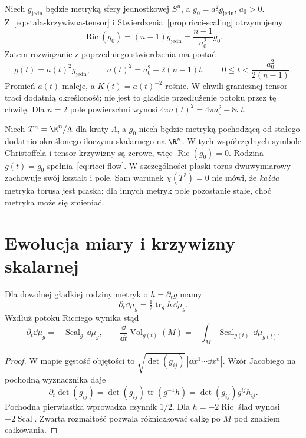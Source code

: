 \begin{przyklad}
\label{prz:ricci-sphere}
Niech $g_{\mathrm{jedn}}$ będzie metryką sfery jednostkowej
$S^n$, a $g_0=a_0^2g_{\mathrm{jedn}}$, $a_0>0$.
Z~\eqref{eq:stala-krzywizna-tensor} i
Stwierdzenia~\ref{prop:ricci-scaling} otrzymujemy
\[
 \operatorname{Ric}(g_0)
 =(n-1)g_{\mathrm{jedn}}
 =\frac{n-1}{a_0^2}g_0.
\]
Zatem rozwiązanie z poprzedniego stwierdzenia ma postać
\begin{equation}\label{eq:ricci-sphere}
 g(t)=a(t)^2g_{\mathrm{jedn}},\qquad
 a(t)^2=a_0^2-2(n-1)t,
 \qquad 0\leq t<\frac{a_0^2}{2(n-1)}.
\end{equation}
Promień $a(t)$ maleje, a $K(t)=a(t)^{-2}$ rośnie.
W chwili granicznej tensor traci dodatnią określoność;
nie jest to gładkie przedłużenie potoku przez tę chwilę.
Dla $n=2$ pole powierzchni wynosi
$4\pi a(t)^2=4\pi a_0^2-8\pi t$.
\end{przyklad}

\begin{przyklad}
\label{prz:ricci-torus}
Niech $T^n=\R^n/\Lambda$ dla kraty $\Lambda$,
a $g_0$ niech będzie metryką pochodzącą od stałego
dodatnio określonego iloczynu skalarnego na $\R^n$.
W tych współrzędnych symbole Christoffela i tensor
krzywizny są zerowe, więc $\operatorname{Ric}(g_0)=0$.
Rodzina $g(t)=g_0$ spełnia~\eqref{eq:ricci-flow}.
W szczególności płaski torus dwuwymiarowy zachowuje
swój kształt i pole. Sam warunek $\chi(T^2)=0$ nie mówi,
że \emph{każda} metryka torusa jest płaska; dla innych
metryk pole pozostanie stałe, choć metryka może się
zmieniać.
\end{przyklad}

\section{Ewolucja miary i krzywizny skalarnej}
\label{sec:ricci-evolution}

\begin{stwierdzenie}
\label{prop:ricci-volume}
Dla dowolnej gładkiej rodziny metryk o
$h=\partial_tg$ mamy
\[
 \partial_t\dd\mu_g
   =\tfrac12\operatorname{tr}_g h\,\dd\mu_g.
\]
Wzdłuż potoku Ricciego wynika stąd
\begin{equation}\label{eq:ricci-volume}
 \partial_t\dd\mu_g=-\operatorname{Scal}_g\,\dd\mu_g,
 \qquad
 \frac{\dd}{\dd t}\operatorname{Vol}_{g(t)}(M)
 =-\int_M\operatorname{Scal}_{g(t)}\,\dd\mu_{g(t)}.
\end{equation}
\end{stwierdzenie}
\begin{proof}
W mapie gęstość objętości to
$\sqrt{\det(g_{ij})}\,|\dd x^1\cdots\dd x^n|$.
Wzór Jacobiego na pochodną wyznacznika daje
\[
 \partial_t\det(g_{ij})
 =\det(g_{ij})\operatorname{tr}(g^{-1}h)
 =\det(g_{ij})g^{ij}h_{ij}.
\]
Pochodna pierwiastka wprowadza czynnik $1/2$.
Dla $h=-2\operatorname{Ric}$ ślad wynosi
$-2\operatorname{Scal}$. Zwarta rozmaitość pozwala
różniczkować całkę po $M$ pod znakiem całkowania.
\end{proof}

